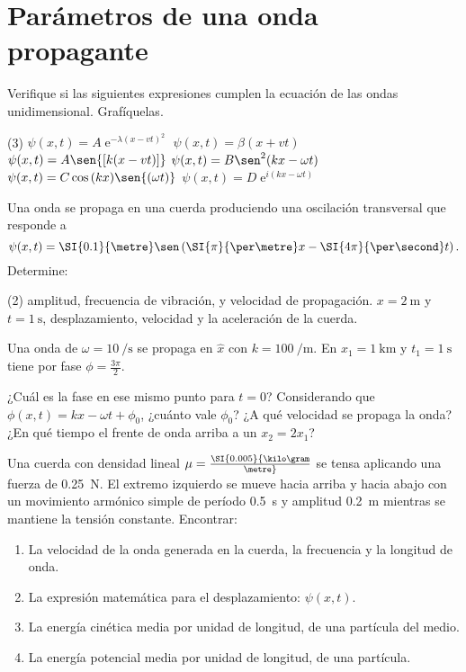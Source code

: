 \section*{Parámetros de una onda propagante}

\item Verifique si las siguientes expresiones cumplen la ecuación de las ondas unidimensional.
Grafíquelas.
\begin{tasks}(3)
	\task $\psi(x,t)= A \operatorname{e}^{- \lambda ( x - v t)^2 }$
	\task $\psi(x,t)= \beta ( x + v t )$
	\task $\psi(x,t)= A \sen{\left[ k (x - v t) \right] }$
	\task $\psi(x,t)= B \sen^2{ \left( k x -\omega t \right) }$
	\task $\psi(x,t)= C \cos{(k x)} \sen{ \left( \omega t \right) }$
	\task $\psi(x,t)= D \operatorname{e}^{i ( k x - \omega t ) }$
\end{tasks}


\item Una onda se propaga en una cuerda produciendo una oscilación transversal que responde a 
\[
\psi(x,t) = \SI{0.1}{\metre} \sen \left( \SI{\pi}{\per\metre} x - \SI{4 \pi}{\per\second} t \right).
\]
Determine:
\begin{tasks}(2)
	\task amplitud,
	\task frecuencia de vibración, y
	\task velocidad de propagación.
	\task $x = \SI{2}{\metre}$ y $ t = \SI{1}{\second}$, desplazamiento, velocidad y la aceleración de la cuerda.
\end{tasks}


\item Una onda de $\omega= \SI{10}{\per\second}$ se propaga en $\hat{x}$ con $k = \SI{100}{\per\metre}$.
En $x_1 = \SI{1}{\kilo\metre}$ y $t_1 = \SI{1}{\second}$ tiene por fase $\phi = \frac{3 \pi}{2}$.
\begin{tasks}
	\task ¿Cuál es la fase en ese mismo punto para $t = 0$?
	\task Considerando que $\phi(x,t) = k x - \omega t+ \phi_0$, ¿cuánto vale $\phi_0$?
	\task ¿A qué velocidad se propaga la onda?
	\task ¿En qué tiempo el frente de onda arriba a un $x_2 = 2 x_1$?
\end{tasks}


\item Una cuerda con densidad lineal $\mu = \SI{0.005}{\kilo\gram\over\metre}$ se tensa aplicando una fuerza de \SI{0.25}{\newton}.
El extremo izquierdo se mueve hacia arriba y hacia abajo con un movimiento armónico simple de período \SI{0.5}{\second} y amplitud \SI{0.2}{\metre} mientras se mantiene la tensión constante.
Encontrar:
\begin{enumerate}
	\item La velocidad de la onda generada en la cuerda, la frecuencia y la longitud de onda.
	\item La expresión matemática para el desplazamiento: $\psi(x,t)$.
	\item La energía cinética media por unidad de longitud, de una partícula del medio.
	\item La energía potencial media por unidad de longitud, de una partícula.
\end{enumerate}
